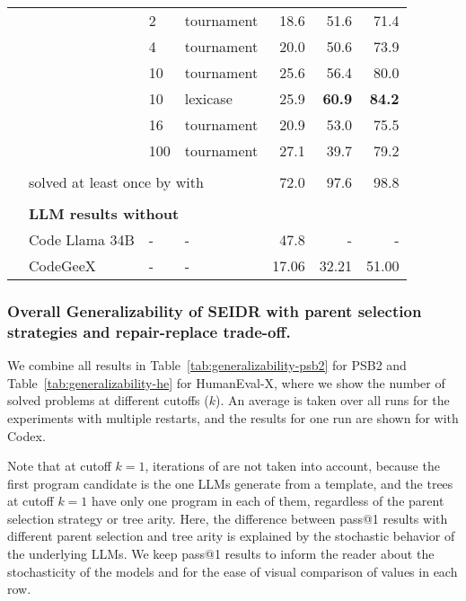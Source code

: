 \begin{table}[t]
\begin{adjustbox}{max width=\textwidth}
\begin{DIFnomarkup}
\begin{tabular}{llllrrr}
       &        & 2   &         tournament &    18.6 &     51.6 &      71.4 \\
       &        & 4   &         tournament &    20.0 &     50.6 &      73.9 \\
       &        & 10  &         tournament &    25.6 &     56.4 &      80.0 \\
       &        & 10  &           lexicase &    25.9 &     \textbf{60.9} &      \textbf{84.2} \\
       &        & 16  &         tournament &    20.9 &     53.0 &      75.5 \\
       &        & 100 &         tournament &    27.1 &     39.7 &      79.2 \\[1pt]
\cline{3-7}\\[-8pt]
       & \multicolumn{3}{l}{solved at least once by \method{} with \llama{}} & 72.0 &     97.6 &      98.8  \\[1pt]
\cline{2-7}\\[-8pt]
& \multicolumn{6}{l}{\textbf{LLM results without \method{}}} \\
& Code Llama 34B & - &  - &  47.8  &  -   &    - \\
& CodeGeeX & - &  - &  17.06  &  32.21   &    51.00 \\[-2pt]
\bottomrule
\end{tabular}
\end{DIFnomarkup} %
\end{adjustbox}
\end{table}

\subsubsection{Overall Generalizability of SEIDR with parent selection strategies and repair-replace trade-off.}
\label{sec:overall-generalizability}

We combine all results in Table~\ref{tab:generalizability-psb2} for PSB2 and Table~\ref{tab:generalizability-he} for HumanEval-X, where we show the number of solved problems at different cutoffs ($k$).  
An average is taken over all runs for the experiments with multiple restarts, and the results for one run are shown for \method{} with Codex. 

Note that at cutoff $k=1$, iterations of \method{} are not taken into account, because the first program candidate is the one LLMs generate from a template, and the trees at cutoff $k=1$ have only one program in each of them, regardless of the parent selection strategy or tree arity. 
Here, the difference between pass@1 results with different parent selection and tree arity is explained by the stochastic behavior of the underlying LLMs. 
We keep pass@1 results to inform the reader about the stochasticity of the models and for the ease of visual comparison of values in each row.

